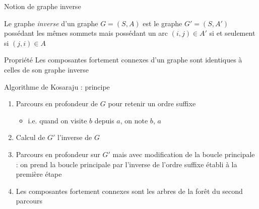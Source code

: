 \begin{frame}{Notion de graphe inverse}
\begin{definition}
    Le graphe \emph{inverse} d'un graphe $G=(S,A)$ est le graphe $G'=(S,A')$ possédant les mêmes sommets mais possédant un arc $(i,j) \in A'$ si et seulement si $(j,i) \in A$    
\end{definition}

\begin{example}
\end{example}

\begin{block}{Propriété}
    Les composantes fortement connexes d'un graphe sont identiques à celles de son graphe inverse
\end{block}

\end{frame}

\begin{frame}{Algorithme de Kosaraju : principe}

\begin{enumerate}
    \item Parcours en profondeur de $G$ pour retenir un ordre suffixe
    \begin{itemize}
        \item i.e. quand on visite $b$ depuis $a$, on note $b$, $a$
    \end{itemize}
    \item Calcul de $G'$ l'inverse de $G$
    \item Parcours en profondeur sur $G'$ mais avec modification de la boucle principale : on prend la boucle principale par l'inverse de l'ordre suffixe établi à la première étape
    \item Les composantes fortement connexes sont les arbres de la forêt du second parcours
\end{enumerate}

\end{frame}


